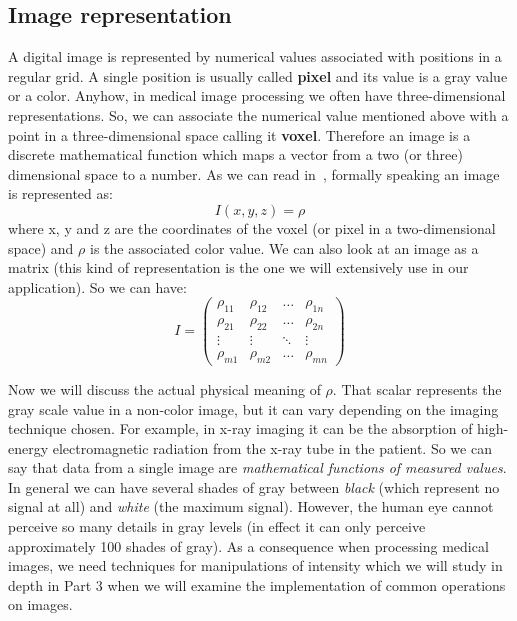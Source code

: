 \subsection{Image representation}

A digital image is represented by numerical values associated with positions in a regular grid. A single position is usually called \textbf{pixel} and its value is a gray value or a color. Anyhow, in medical image processing we often have three-dimensional representations. So, we can associate the numerical value mentioned above with a point in a three-dimensional space calling it \textbf{voxel}. Therefore an image is a discrete mathematical function which maps a vector from a two (or three) dimensional space to a number. As we can read in~\cite{Birkfellner}, formally speaking an image is represented as:
\begin{equation}
 I(x, y, z) = \rho
\end{equation}
where x, y and z are the coordinates of the voxel (or pixel in a two-dimensional space) and $\rho$ is the associated color value.
We can also look at an image as a matrix (this kind of representation is the one we will extensively use in our application). So we can have:
\begin{equation}
I =
\begin{pmatrix}
\rho_{11} & \rho_{12} & \ldots & \rho_{1n} \\
\rho_{21} & \rho_{22} & \ldots & \rho_{2n} \\
\vdots & \vdots & \ddots & \vdots \\
\rho_{m1} & \rho_{m2} & \ldots & \rho_{mn}
\end{pmatrix}
\end{equation}

Now we will discuss the actual physical meaning of $\rho$. That scalar represents the gray scale value in a non-color image, but it can vary depending on the imaging technique chosen. For example, in x-ray imaging it can be the absorption of high-energy electromagnetic radiation from the x-ray tube in the patient. So we can say that data from a single image are \textit{mathematical functions of measured values}.
In general we can have several shades of gray between \textit{black} (which represent no signal at all) and \textit{white} (the maximum signal). However, the human eye cannot perceive so many details in gray levels (in effect it can only perceive approximately 100 shades of gray). As a consequence when processing medical images, we need techniques for manipulations of intensity which we will study in depth in Part 3 when we will examine the implementation of common operations on images.

